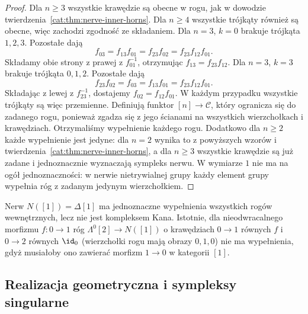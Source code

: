 \begin{proof}
Dla $n\geq3$ wszystkie krawędzie są obecne w rogu, jak w dowodzie twierdzenia~\ref{cat:thm:nerve-inner-horns}. Dla $n\geq4$ wszystkie trójkąty również są obecne, więc zachodzi zgodność ze składaniem. Dla $n=3$, $k=0$ brakuje trójkąta $1,2,3$. Pozostałe dają
\[
 f_{03}=f_{13}f_{01}=f_{23}f_{02}
       =f_{23}f_{12}f_{01}.
\]
Składamy obie strony z prawej z $f_{01}^{-1}$, otrzymując $f_{13}=f_{23}f_{12}$. Dla $n=3$, $k=3$ brakuje trójkąta $0,1,2$. Pozostałe dają
\[
 f_{23}f_{02}=f_{03}=f_{13}f_{01}
              =f_{23}f_{12}f_{01}.
\]
Składając z lewej z $f_{23}^{-1}$, dostajemy $f_{02}=f_{12}f_{01}$. W każdym przypadku wszystkie trójkąty są więc przemienne. Definiują funktor $[n]\to\mathcal C$, który ogranicza się do zadanego rogu, ponieważ zgadza się z jego ścianami na wszystkich wierzchołkach i krawędziach. Otrzymaliśmy wypełnienie każdego rogu. Dodatkowo dla $n\geq2$ każde wypełnienie jest jedyne: dla $n=2$ wynika to z powyższych wzorów i twierdzenia~\ref{cat:thm:nerve-inner-horns}, a dla $n\geq3$ wszystkie krawędzie są już zadane i jednoznacznie wyznaczają sympleks nerwu. W wymiarze $1$ nie ma na ogół jednoznaczności: w nerwie nietrywialnej grupy każdy element grupy wypełnia róg z zadanym jedynym wierzchołkiem.
\end{proof}

\begin{przyklad}\label{cat:ex:nerve-not-kan}
Nerw $N([1])=\Delta[1]$ ma jednoznaczne wypełnienia wszystkich rogów wewnętrznych, lecz nie jest kompleksem Kana. Istotnie, dla nieodwracalnego morfizmu $f:0\to1$ róg $\Lambda^0[2]\to N([1])$ o krawędziach $0\to1$ równych $f$ i $0\to2$ równych $\id_0$ (wierzchołki rogu mają obrazy $0,1,0$) nie ma wypełnienia, gdyż musiałoby ono zawierać morfizm $1\to0$ w kategorii $[1]$.
\end{przyklad}

\subsection{Realizacja geometryczna i sympleksy singularne}

